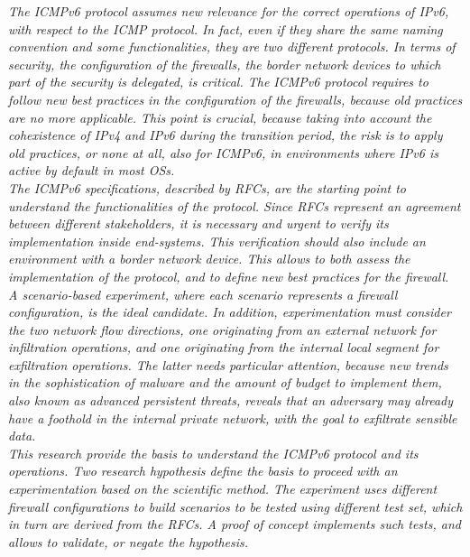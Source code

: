\documentclass[12pt]{article}
\begin{document}
\textit{The ICMPv6 protocol assumes new relevance for the correct operations of IPv6, with respect to the ICMP protocol. In fact, even if they share the same naming convention and some functionalities, they are two different protocols. In terms of security, the configuration of the firewalls, the border network devices to which part of the security is delegated, is critical. The ICMPv6 protocol requires to follow new best practices in the configuration of the firewalls, because old practices are no more applicable. This point is crucial, because taking into account the cohexistence of IPv4 and IPv6 during the transition period, the risk is to apply old practices, or none at all, also for ICMPv6, in environments where IPv6 is active by default in most OSs.\\
The ICMPv6 specifications, described by RFCs, are the starting point to understand the functionalities of the protocol. Since RFCs represent an agreement between different stakeholders, it is necessary and urgent to verify its implementation inside end-systems. This verification should also include an environment with a border network device. This allows to both assess the implementation of the protocol, and to define new best practices for the firewall.\\
A scenario-based experiment, where each scenario represents a firewall configuration, is the ideal candidate. In addition, experimentation must consider the two network flow directions, one originating from an external network for infiltration operations, and one originating from the internal local segment for exfiltration operations. The latter needs particular attention, because new trends in the sophistication of malware and the amount of budget to implement them, also known as advanced persistent threats, reveals that an adversary may already have a foothold in the internal private network, with the goal to exfiltrate sensible data.\\
This research provide the basis to understand the ICMPv6 protocol and its operations. Two research hypothesis define the basis to proceed with an experimentation based on the scientific method. The experiment uses different firewall configurations to build scenarios to be tested using different test set, which in turn are derived from the RFCs. A proof of concept implements such tests, and allows to validate, or negate the hypothesis.}

\pagebreak

\end{document}
